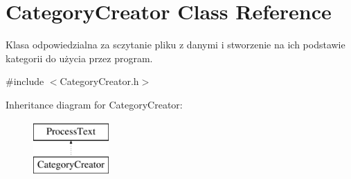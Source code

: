 \hypertarget{class_category_creator}{}\section{Category\+Creator Class Reference}
\label{class_category_creator}


Klasa odpowiedzialna za sczytanie pliku z danymi i stworzenie na ich podstawie kategorii do użycia przez program.  




{\ttfamily \#include $<$Category\+Creator.\+h$>$}

Inheritance diagram for Category\+Creator\+:\begin{figure}[H]
\begin{center}
\leavevmode
\includegraphics[height=2.000000cm]{class_category_creator}
\end{center}
\end{figure}

